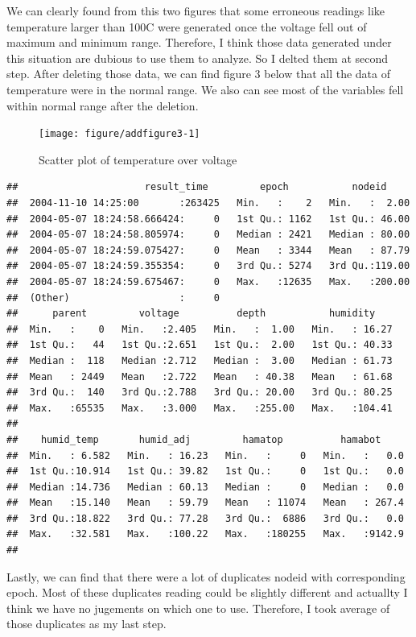 \documentclass{article}\usepackage[]{graphicx}\usepackage[]{color}
\makeatletter
\newenvironment{kframe}{%
 \def\at@end@of@kframe{}%
 \ifinner\ifhmode%
  \def\at@end@of@kframe{\end{minipage}}%
  \begin{minipage}{\columnwidth}%
 \fi\fi%
 \def\FrameCommand##1{\hskip\@totalleftmargin \hskip-\fboxsep
 \colorbox{shadecolor}{##1}\hskip-\fboxsep
     \hskip-\linewidth \hskip-\@totalleftmargin \hskip\columnwidth}%
 \MakeFramed {\advance\hsize-\width
   \@totalleftmargin\z@ \linewidth\hsize
   \@setminipage}}%
 {\par\unskip\endMakeFramed%
 \at@end@of@kframe}
\newenvironment{knitrout}{}{} %
\makeatother
\begin{document}
We can clearly found from this two figures that some erroneous readings like temperature larger than 100C were generated once the voltage fell out of maximum and minimum range. Therefore, I think those data generated under this situation are dubious to use them to analyze. So I delted them at second step. After deleting those data, we can find figure 3 below that all the data of temperature were in the normal range. We also can see most of the variables fell within normal range after the deletion.
\begin{knitrout}
\color{fgcolor}\begin{figure}[h!]

{\centering \texttt{[image: figure/addfigure3-1]} 

}

\caption[Scatter plot of temperature over voltage]{Scatter plot of temperature over voltage}\label{fig:addfigure3}
\end{figure}

\begin{kframe}\begin{verbatim}
##                      result_time         epoch           nodeid      
##  2004-11-10 14:25:00       :263425   Min.   :    2   Min.   :  2.00  
##  2004-05-07 18:24:58.666424:     0   1st Qu.: 1162   1st Qu.: 46.00  
##  2004-05-07 18:24:58.805974:     0   Median : 2421   Median : 80.00  
##  2004-05-07 18:24:59.075427:     0   Mean   : 3344   Mean   : 87.79  
##  2004-05-07 18:24:59.355354:     0   3rd Qu.: 5274   3rd Qu.:119.00  
##  2004-05-07 18:24:59.675467:     0   Max.   :12635   Max.   :200.00  
##  (Other)                   :     0                                   
##      parent         voltage          depth           humidity     
##  Min.   :    0   Min.   :2.405   Min.   :  1.00   Min.   : 16.27  
##  1st Qu.:   44   1st Qu.:2.651   1st Qu.:  2.00   1st Qu.: 40.33  
##  Median :  118   Median :2.712   Median :  3.00   Median : 61.73  
##  Mean   : 2449   Mean   :2.722   Mean   : 40.38   Mean   : 61.68  
##  3rd Qu.:  140   3rd Qu.:2.788   3rd Qu.: 20.00   3rd Qu.: 80.25  
##  Max.   :65535   Max.   :3.000   Max.   :255.00   Max.   :104.41  
##                                                                   
##    humid_temp       humid_adj         hamatop          hamabot      
##  Min.   : 6.582   Min.   : 16.23   Min.   :     0   Min.   :   0.0  
##  1st Qu.:10.914   1st Qu.: 39.82   1st Qu.:     0   1st Qu.:   0.0  
##  Median :14.736   Median : 60.13   Median :     0   Median :   0.0  
##  Mean   :15.140   Mean   : 59.79   Mean   : 11074   Mean   : 267.4  
##  3rd Qu.:18.822   3rd Qu.: 77.28   3rd Qu.:  6886   3rd Qu.:   0.0  
##  Max.   :32.581   Max.   :100.22   Max.   :180255   Max.   :9142.9  
## 
\end{verbatim}
\end{kframe}
\end{knitrout}
Lastly, we can find that there were a lot of duplicates nodeid with corresponding epoch. Most of these duplicates reading could be slightly different and actuallty I think we have no jugements on which one to use. Therefore, I took average of those duplicates as my last step.
\end{document}
